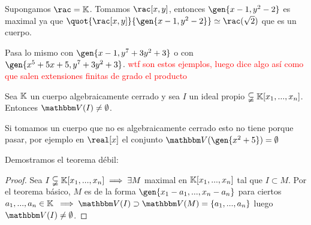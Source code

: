 \obs Supongamos $\rac = \K$. Tomamos $\rac[x,y]$, entonces $\gen{x-1,y^2-2}$ es maximal ya que $\quot{\rac[x,y]}{\gen{x-1,y^2-2}} \simeq \rac(\sqrt{2})$  que es un cuerpo.

Pasa lo mismo con $\gen{x-1,y^7+3y^2+3}$ o con $\gen{x^5+5x+5, y^7+3y^2+3}$. \textcolor{red}{wtf son estos ejemplos, luego dice algo así como que salen extensiones finitas de grado el producto}

\begin{theorem}
	Sea $\mathbb{K}$ un cuerpo algebraicamente cerrado y sea $I$ un ideal propio $\subsetneqq \mathbb{K}[x_1,...,x_n]$. Entonces $\V(I) \neq \emptyset$.
\end{theorem}

\obs Si tomamos un cuerpo que no es algebraicamente cerrado esto no tiene porque pasar, por ejemplo en $\real[x]$ el conjunto $\V(\gen{x^2+5})=\emptyset$


Demostramos el teorema débil:
\begin{proof}
	Sea $I \subsetneqq \mathbb{K}[x_1,...,x_n] \implies \exists M$ maximal en $\mathbb{K}[x_1,...,x_n]$ tal que $I \subset M$. Por el teorema básico, $M$ es de la forma $\gen{x_1-a_1,...,x_n-a_n}$ para ciertos $a_1,...,a_n \in \mathbb{K}$ $\implies \V(I) \supset \V(M)=\{a_1,...,a_n\}$ luego $\V(I)\neq \emptyset$.
\end{proof}


